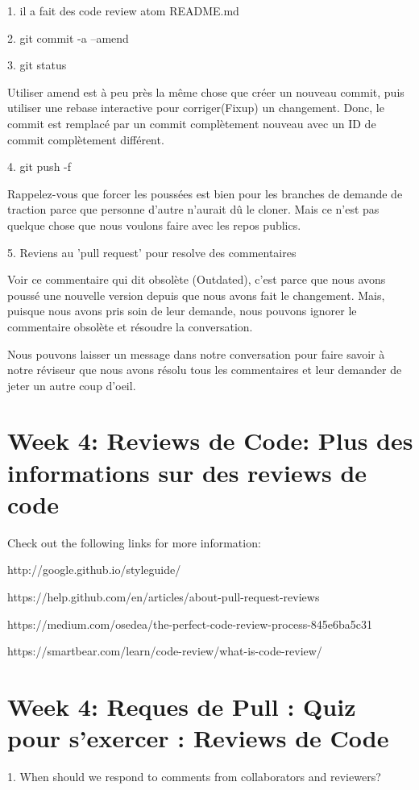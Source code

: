 \documentclass[11pt, onecolumn]{article}
\begin{document}
1. il a fait des code review
atom README.md

2. git commit -a --amend

3. git status

Utiliser amend est à peu près la même chose que créer un nouveau commit, puis utiliser une rebase interactive pour corriger(Fixup)  un changement. Donc, le commit est remplacé par un commit complètement nouveau avec un ID de commit complètement différent. 

4. git push -f

Rappelez-vous que forcer les poussées est bien pour les branches de demande de traction parce que personne d'autre n'aurait dû le cloner. Mais ce n'est pas quelque chose que nous voulons faire avec les repos publics.

5. Reviens au 'pull request' pour resolve des commentaires

Voir ce commentaire qui dit obsolète (Outdated), c'est parce que nous avons poussé une nouvelle version depuis que nous avons fait le changement. Mais, puisque nous avons pris soin de leur demande, nous pouvons ignorer le commentaire obsolète et résoudre la conversation. 


Nous pouvons laisser un message dans notre conversation pour faire savoir à notre réviseur que nous avons résolu tous les commentaires et leur demander de jeter un autre coup d'oeil. 


\section{Week 4: Reviews de Code: Plus des informations sur des reviews de code}

Check out the following links for more information:

    http://google.github.io/styleguide/

    https://help.github.com/en/articles/about-pull-request-reviews

    https://medium.com/osedea/the-perfect-code-review-process-845e6ba5c31

    https://smartbear.com/learn/code-review/what-is-code-review/


\section{Week 4: Reques de Pull : Quiz pour s'exercer : Reviews de Code}

1. When should we respond to comments from collaborators and reviewers?
\end{document}
